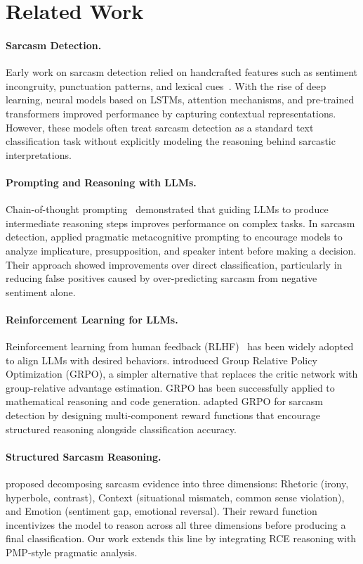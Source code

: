 \documentclass{article}
\begin{document}
\section{Related Work}

\paragraph{Sarcasm Detection.}
Early work on sarcasm detection relied on handcrafted features such as sentiment incongruity, punctuation patterns, and lexical cues~\citep{joshi2017context}. With the rise of deep learning, neural models based on LSTMs, attention mechanisms, and pre-trained transformers improved performance by capturing contextual representations. However, these models often treat sarcasm detection as a standard text classification task without explicitly modeling the reasoning behind sarcastic interpretations.

\paragraph{Prompting and Reasoning with LLMs.}
Chain-of-thought prompting~\citep{wei2022chain} demonstrated that guiding LLMs to produce intermediate reasoning steps improves performance on complex tasks. In sarcasm detection, \citet{pmp} applied pragmatic metacognitive prompting to encourage models to analyze implicature, presupposition, and speaker intent before making a decision. Their approach showed improvements over direct classification, particularly in reducing false positives caused by over-predicting sarcasm from negative sentiment alone.

\paragraph{Reinforcement Learning for LLMs.}
Reinforcement learning from human feedback (RLHF)~\citep{ouyang2022training} has been widely adopted to align LLMs with desired behaviors. \citet{deepseekr1} introduced Group Relative Policy Optimization (GRPO), a simpler alternative that replaces the critic network with group-relative advantage estimation. GRPO has been successfully applied to mathematical reasoning and code generation. \citet{sarcasmr1} adapted GRPO for sarcasm detection by designing multi-component reward functions that encourage structured reasoning alongside classification accuracy.

\paragraph{Structured Sarcasm Reasoning.}
\citet{sarcasmr1} proposed decomposing sarcasm evidence into three dimensions: Rhetoric (irony, hyperbole, contrast), Context (situational mismatch, common sense violation), and Emotion (sentiment gap, emotional reversal). Their reward function incentivizes the model to reason across all three dimensions before producing a final classification. Our work extends this line by integrating RCE reasoning with PMP-style pragmatic analysis.
\end{document}
